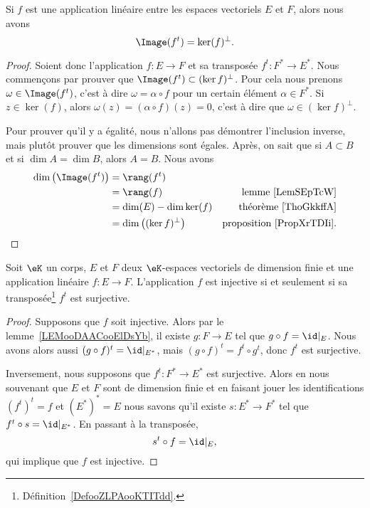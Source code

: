 \begin{proposition}        \label{PropWOPIooBHFDdP}
    Si \( f\) est une application linéaire entre les espaces vectoriels \( E\) et \( F\), alors nous avons
    \begin{equation}
        \Image(f^t)=\ker(f)^{\perp}.
    \end{equation}
\end{proposition}

\begin{proof}
    Soient donc l'application \( f\colon E\to F\) et sa transposée \( f^t\colon F^*\to E^*\). Nous commençons par prouver que \( \Image(f^{t})\subset(\ker f)^{\perp}\). Pour cela nous prenons \( \omega\in \Image(f^t)\), c'est à dire \( \omega=\alpha\circ f\) pour un certain élément \( \alpha\in F^*\). Si \( z\in\ker(f)\), alors \( \omega(z)=(\alpha\circ f)(z)=0\), c'est à dire que \( \omega\in (\ker f)^{\perp}\).

    Pour prouver qu'il y a égalité, nous n'allons pas démontrer l'inclusion inverse, mais plutôt prouver que les dimensions sont égales. Après, on sait que si \( A\subset B\) et si \( \dim A=\dim B\), alors \( A=B\). Nous avons
    \begin{subequations}
        \begin{align}
            \dim\big( \Image(f^t) \big)&=\rang(f^t)\\
            &=\rang(f)  &\text{lemme~\ref{LemSEpTcW}}\\
            &=\dim(E)-\dim\ker(f)   &\text{théorème~\ref{ThoGkkffA}}\\
            &=\dim\big( (\ker f)^{\perp} \big)  &\text{proposition~\ref{PropXrTDIi}}.
        \end{align}
    \end{subequations}
\end{proof}

\begin{lemma}
    Soit \( \eK\) un corps, \( E\) et \( F\) deux \( \eK\)-espaces vectoriels de dimension finie et une application linéaire \( f\colon E\to F\). L'application \( f\) est injective si et seulement si sa transposée\footnote{Définition~\ref{DefooZLPAooKTITdd}.} \( f^t\) est surjective.
\end{lemma}

\begin{proof}
    Supposons que \( f\) soit injective. Alors par le lemme~\ref{LEMooDAACooElDsYb}, il existe \( g\colon F\to E\) tel que \( g\circ f=\id|_E\). Nous avons alors aussi \( (g\circ f)^t=\id|_{E^*}\), mais \( (g\circ f)^t=f^t\circ g^t\), donc \( f^t\) est surjective.

    Inversement, nous supposons que \( f^t\colon F^*\to E^*\) est surjective. Alors en nous souvenant que \( E\) et \( F\) sont de dimension finie et en faisant jouer les identifications \( (f^t)^t=f\) et \( (E^*)^*=E\) nous savons qu'il existe \( s\colon E^*\to F^*\) tel que \( f^t\circ s=\id|_{E^*}\). En passant à la transposée,
    \begin{equation}
        s^t\circ f=\id|_{E},
    \end{equation}
    qui implique que \( f\) est injective.
\end{proof}

